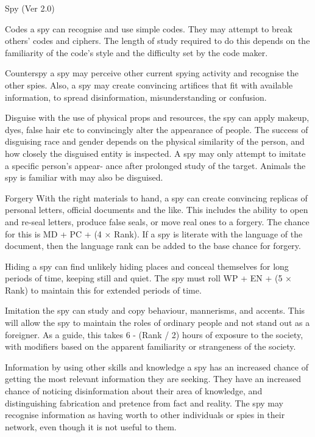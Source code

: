 \begin{Chapter}{Spy (Ver 2.0)}
\begin{Description}
\item[Codes] a spy can recognise and use simple codes.  They may
  attempt to break others’ codes and ciphers.  The length of study
  required to do this depends on the familiarity of the code’s style
  and the difficulty set by the code maker.

\item[Counterspy] a spy may perceive other current spying activity and
  recognise the other spies. Also, a spy may create convincing
  artifices that fit with available information, to spread
  disinformation, misunderstanding or confusion.

\item[Disguise] with the use of physical props and resources, the spy
  can apply makeup, dyes, false hair etc to convincingly alter the
  appearance of people.  The success of disguising race and gender
  depends on the physical similarity of the person, and how closely
  the disguised entity is inspected. A spy may only attempt to imitate
  a specific person’s appear- ance after prolonged study of the
  target.  Animals the spy is familiar with may also be disguised.

\item[Forgery] With the right materials to hand, a spy can create
  convincing replicas of personal letters, official documents and the
  like.  This includes the ability to open and re-seal letters,
  produce false seals, or move real ones to a forgery.  The chance for
  this is MD + PC + (4 × Rank). If a spy is literate with the language
  of the document, then the language rank can be added to the base
  chance for forgery.

\item[Hiding] a spy can find unlikely hiding places and conceal
  themselves for long periods of time, keeping still and quiet. The
  spy must roll WP + EN + (5 × Rank) to maintain this for extended
  periods of time.

\item[Imitation] the spy can study and copy behaviour, mannerisms, and
  accents. This will allow the spy to maintain the roles of ordinary
  people and not stand out as a foreigner.  As a guide, this takes 6 -
  (Rank / 2) hours of exposure to the society, with modifiers based on
  the apparent familiarity or strangeness of the society.

\item[Information] by using other skills and knowledge a spy has an
  increased chance of getting the most relevant information they are
  seeking.  They have an increased chance of noticing disinformation
  about their area of knowledge, and distinguishing fabrication and
  pretence from fact and reality.  The spy may recognise information
  as having worth to other individuals or spies in their network, even
  though it is not useful to them.


\end{Description}
\end{Chapter}
